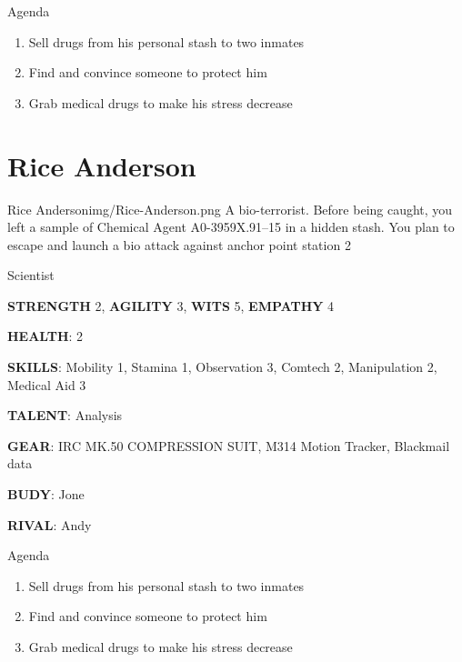 \begin{rpg-commentbox}{Agenda}
    \begin{enumerate}[label=\textbf{Act \arabic*}, leftmargin=1cm]
        \item Sell drugs from his personal stash to two inmates
        \item Find and convince someone to protect him
        \item Grab medical drugs to make his stress decrease
    \end{enumerate}
\end{rpg-commentbox}

\newsect


\section{Rice Anderson}

\begin{rpg-pcbox}{Rice Anderson}{img/Rice-Anderson.png}
    A bio-terrorist. Before being caught, you left a sample of Chemical Agent A0-3959X.91–15 in a hidden stash. You plan to escape and launch a bio attack against anchor point station 2
\end{rpg-pcbox}

\begin{rpg-commentbox}{}
    Scientist

    \textbf{STRENGTH} 2, \textbf{AGILITY} 3, \textbf{WITS} 5, \textbf{EMPATHY} 4

    \textbf{HEALTH}: 2

    \textbf{SKILLS}: Mobility 1, Stamina 1, Observation 3, Comtech 2, Manipulation 2, Medical Aid 3
    
    \textbf{TALENT}: Analysis
    
    \textbf{GEAR}: IRC MK.50 COMPRESSION SUIT, M314 Motion Tracker, Blackmail data

    \textbf{BUDY}: Jone
    
    \textbf{RIVAL}: Andy
\end{rpg-commentbox}


\begin{rpg-commentbox}{Agenda}
    \begin{enumerate}[label=\textbf{Act \arabic*}, leftmargin=1cm]
        \item Sell drugs from his personal stash to two inmates
        \item Find and convince someone to protect him
        \item Grab medical drugs to make his stress decrease
    \end{enumerate}
\end{rpg-commentbox}


